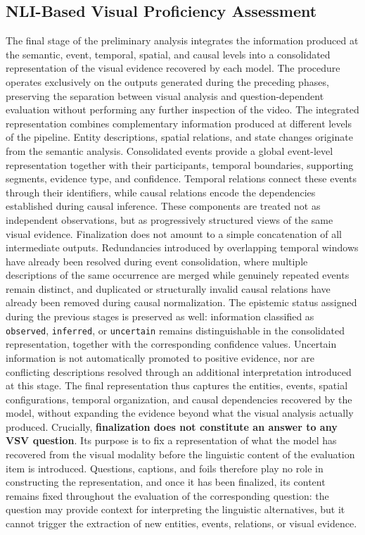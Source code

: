 \subsection*{NLI-Based Visual Proficiency Assessment}
The final stage of the preliminary analysis integrates the information produced at the semantic, event, temporal, spatial, and causal levels into a consolidated representation of the visual evidence recovered by each model. The procedure operates exclusively on the outputs generated during the preceding phases, preserving the separation between visual analysis and question-dependent evaluation without performing any further inspection of the video.
The integrated representation combines complementary information produced at different levels of the pipeline. Entity descriptions, spatial relations, and state changes originate from the semantic analysis. Consolidated events provide a global event-level representation together with their participants, temporal boundaries, supporting segments, evidence type, and confidence. Temporal relations connect these events through their identifiers, while causal relations encode the dependencies established during causal inference. These components are treated not as independent observations, but as progressively structured views of the same visual evidence.
Finalization does not amount to a simple concatenation of all intermediate outputs. Redundancies introduced by overlapping temporal windows have already been resolved during event consolidation, where multiple descriptions of the same occurrence are merged while genuinely repeated events remain distinct, and duplicated or structurally invalid causal relations have already been removed during causal normalization. The epistemic status assigned during the previous stages is preserved as well: information classified as \texttt{observed}, \texttt{inferred}, or \texttt{uncertain} remains distinguishable in the consolidated representation, together with the corresponding confidence values. Uncertain information is not automatically promoted to positive evidence, nor are conflicting descriptions resolved through an additional interpretation introduced at this stage. The final representation thus captures the entities, events, spatial configurations, temporal organization, and causal dependencies recovered by the model, without expanding the evidence beyond what the visual analysis actually produced.
Crucially, \textbf{finalization does not constitute an answer to any \acs{VSV} question}. Its purpose is to fix a representation of what the model has recovered from the visual modality before the linguistic content of the evaluation item is introduced. Questions, captions, and foils therefore play no role in constructing the representation, and once it has been finalized, its content remains fixed throughout the evaluation of the corresponding question: the question may provide context for interpreting the linguistic alternatives, but it cannot trigger the extraction of new entities, events, relations, or visual evidence.
